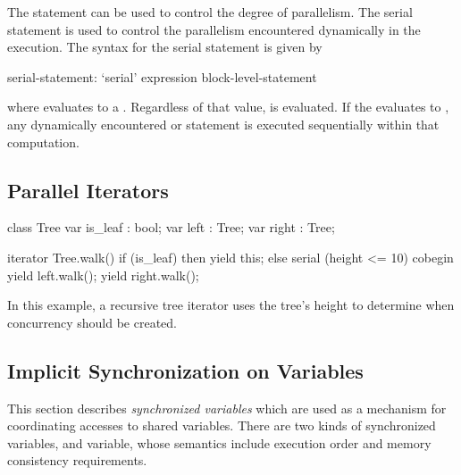 The  statement can be used to control the degree of parallelism.
The serial statement is used to control the parallelism encountered
dynamically in the execution.  The syntax for the serial statement is
given by
\begin{syntax}
serial-statement:
  `serial' expression block-level-statement
\end{syntax}
where  evaluates to a .  Regardless of
that value,  is evaluated. If
the  evaluates to , any dynamically
encountered  or  statement is executed
sequentially within that computation.



\subsection{Parallel Iterators}
\label{Parallel_Iterators}

\begin{example}
\begin{chapel}      
class Tree {
  var is_leaf : bool;
  var left    : Tree;
  var right   : Tree;
}

iterator Tree.walk() {
  if (is_leaf) then
    yield this;
  else
    serial (height <= 10) cobegin {
      yield left.walk();
      yield right.walk();
    }
}
\end{chapel}
In this example, a recursive tree iterator uses the tree's height to
determine when concurrency should be created.
\end{example}


\subsection{Implicit Synchronization on Variables}
\label{Implicit_Synchronization_on_Variables}

This section describes {\em synchronized variables} which are used as
a mechanism for coordinating accesses to shared variables. There are
two kinds of synchronized variables,  and 
variable, whose semantics include execution order and memory
consistency requirements.



